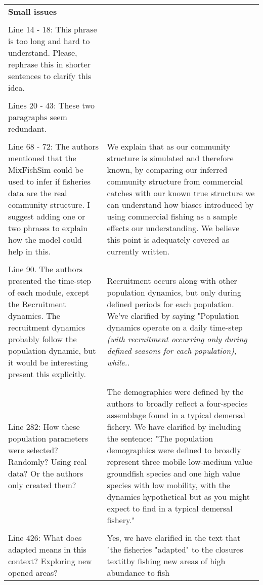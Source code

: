 \documentclass[10pt]{letter}
\begin{document}
\begin{landscape}
\begin{center}
\begin{longtable}{p{12cm} | p{12cm}}
		\hline

	\textbf{Small issues} &  \\
\\
Line 14 - 18: This phrase is too long and hard to understand. Please, rephrase
this in shorter sentences to clarify this idea. & \\
\\
Lines 20 - 43: These two paragraphs seem redundant.  & \\
\\
Line 68 - 72: The authors mentioned that the MixFishSim could be used to infer
if fisheries data are the real community structure. I suggest adding one or two
phrases to explain how the model could help in this. & We explain that as our
community structure is simulated and therefore known, by comparing our inferred
community structure from commercial catches with our known true structure we
can understand how biases introduced by using commercial fishing as a sample
effects our understanding. We believe this point is adequately covered as
currently written.\\
\\
Line 90. The authors presented the time-step of each module, except the
Recruitment dynamics. The recruitment dynamics probably follow the population
dynamic, but it would be interesting present this explicitly. & Recruitment
occurs along with other population dynamics, but only during defined periods
for each population. We've clarified by saying "Population dynamics operate on
a daily time-step \textit{(with recruitment occurring only during defined
	seasons for each population), while..}\\
\\
Line 282: How these population parameters were selected? Randomly? Using real
data? Or the authors only created them? & The demographics were defined by the
authors to broadly reflect a four-species assemblage found in a typical
demersal fishery. We have clarified by including the sentence:  "The population
demographics were defined to broadly represent three mobile low-medium value
groundfish species and one high value species with low mobility, with the
dynamics hypothetical but as you might expect to find in a typical demersal
fishery." \\ 
\\ 
Line 426: What does adapted means in this context? Exploring
new opened areas?
& Yes, we have clarified in the text that "the fisheries "adapted" to the
closures textit{by fishing new areas of high abundance to fish}\\

\end{longtable}
\end{center}
\end{landscape}
\end{document}
